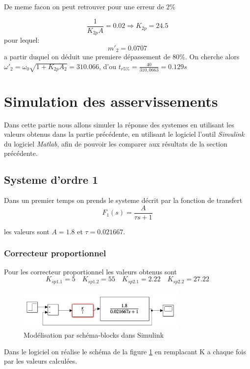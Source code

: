 \documentclass[12pt, a4paper]{report}
\begin{document}
De meme facon on peut retrouver pour une erreur de $2\%$

$$
\frac{1}{K_{2p}A} = 0.02 \Rightarrow K_{2p} = 24.5
$$
pour lequel:
$$
    m'_{2} = 0.0707
$$
a partir duquel on déduit une premiere dépassement de $80\%$. On cherche alors $\omega'_{2} = \omega_0 \sqrt{1 + K_{2p}A_2} = 310.066$, d'ou $t_{r5\%} = \frac{40}{310,0663} = 0.129s$


\section{Simulation des asservissements}

Dans cette partie nous allons simuler la réponse des systemes en utilisant les valeurs
obtenus dans la partie précédente, en utilisant le logiciel l'outil \textit{Simulink} du logiciel \textit{Matlab},
afin de pouvoir les comparer aux résultats de la section précédente.

\subsection{Systeme d'ordre 1}
Dans un premier temps on prends le systeme décrit par la fonction de transfert
$$
    F_{1}(s) = \frac{A}{\tau s + 1}
$$

les valeurs sont $A = 1.8$ et $\tau = 0.021667$.

\subsubsection{Correcteur proportionnel}

Pour les correcteur proportionnel les valeurs obtenus sont 
$$
    K_{sp1.1} = 5 \quad K_{sp1.2} = 55 \quad K_{sp2.1} = 2.22 \quad K_{sp2.2} = 27.22
$$

\begin{figure}[h]
    \centering
    \includegraphics[width=0.75\textwidth]{schemasimulink1.png}
    \caption{Modélisation par schéma-blocks dans Simulink}
    \label{fig:schemablocksim1}
\end{figure}

Dans le logiciel on réalise le schéma de la figure \ref{fig:schemablocksim1} en remplacant K
a chaque fois par les valeurs calculées.
\end{document}
